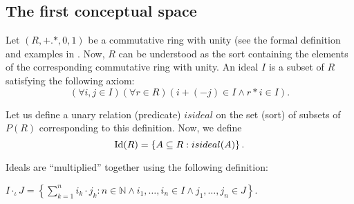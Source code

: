 

\subsection{The first conceptual space}
Let $(R,+.*,0,1)$ be a commutative ring with unity (see the formal
definition and examples in \cite{eisenbud}. Now, $R$ can be understood
as the sort containing the elements of the corresponding commutative
ring with unity.  An ideal $I$ is a subset of $R$ satisfying the
following axiom:
\[(\forall i,j\in I)(\forall r\in R)(i+(-j)\in I \wedge r*i\in I).\]

Let us define a unary relation (predicate) $isideal$
on the set (sort) of subsets of $P(R)$ corresponding to this definition.
Now, we define
\[{\rm Id}(R)=\left\{A\subseteq R: isideal(A) \right\}.\]

Ideals are ``multiplied'' together using the following definition:
%
%

\begin{adjustbox}{width=\columnwidth}
  \(
  \displaystyle
  I\cdot_{\iota} J=\left\{\sum_{k=1}^ni_k\cdot j_k:n \in \mathbb{N}
  \wedge i_1, \ldots, i_n\in I \wedge j_1, \ldots, j_n\in J \right\}.
  \)
\end{adjustbox}

